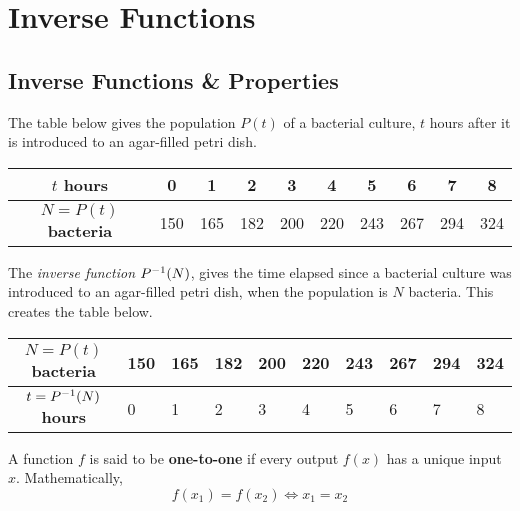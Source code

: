 \documentclass[notes]{subfiles}
\begin{document}
	\setcounter{section}{4}
	\fancyhead[LO,RE]{\bfseries \currentname}
	\fancyfoot[C]{{}}
	\fancyfoot[LO,RE]{\large \thepage}	%

\section*{Inverse Functions}\label{cs14}
	\subsection*{Inverse Functions \& Properties}
		\begin{ex}
			The table below gives the population \(P(t)\) of a bacterial culture, \(t\) hours after it is introduced to an agar-filled petri dish.
			\begin{center}
				\renewcommand{\arraystretch}{1.5}
				\begin{tabular}{|c|c|c|c|c|c|c|c|c|c|}\hline
					\(t\) \textbf{hours}		& 0	&1	&2	&3	&4	&5	&6	&7	&8 \\ \hline
					\(N =P(t)\) \textbf{bacteria}	&150	&165	&182	&200	&220	&243	&267	&294	&324\\ \hline
				\end{tabular}
			\end{center}
			The \emph{inverse function} \(P^{-1}(N)\), gives the time elapsed since a bacterial culture was introduced to an agar-filled petri dish, when the population is \(N\) bacteria.  This creates the table below.
			\begin{center}
				\renewcommand{\arraystretch}{1.5}
				\begin{tabular}{|c|P{.4in}|P{.4in}|P{.4in}|P{.4in}|P{.4in}|P{.4in}|P{.4in}|P{.4in}|P{.4in}|}\hline
					\(N =P(t)\) \textbf{bacteria}	&150	&165	&182	&200	&220	&243	&267	&294	&324\\ \hline
					\(t = P^{-1}(N)\) \textbf{hours}& 0 & 1 & 2 & 3 & 4 & 5 & 6 & 7 & 8 \\ \hline 

				\end{tabular}
			\end{center}
		\end{ex}
			
		\begin{defn}
			A function \(f\) is said to be \textbf{one-to-one} if every output \(f(x)\) has a unique input \(x\). Mathematically,
				\[f(x_1) = f(x_2)\iff x_1 = x_2\]
		\end{defn}
	
\end{document}
